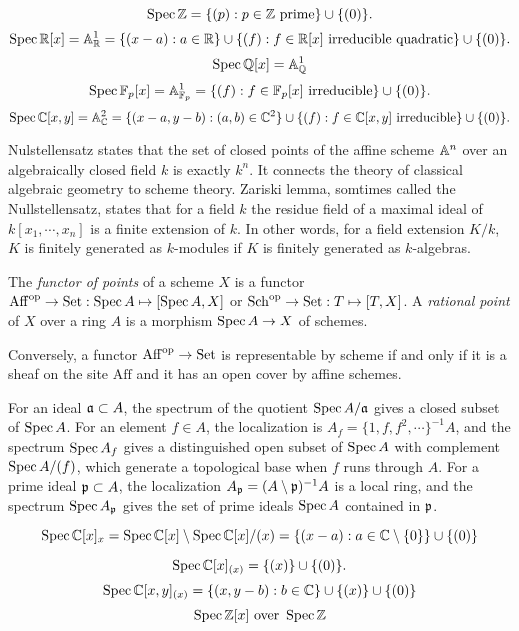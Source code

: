 \documentclass{../../large}
\begin{document}
\[\operatorname{Spec}\mathbb{Z}=\{(p):p\in\mathbb{Z}\text{ prime}\}\cup\{(0)\}.\]
\[\operatorname{Spec}\mathbb{R}[x]=\mathbb{A}^1_{\mathbb{R}}=\{(x-a):a\in\mathbb{R}\}\cup\{(f):f\in\mathbb{R}[x]\text{ irreducible quadratic}\}\cup\{(0)\}.\]
\[\operatorname{Spec}\mathbb{Q}[x]=\mathbb{A}^1_{\mathbb{Q}}\]
\[\operatorname{Spec}\mathbb{F}_p[x]=\mathbb{A}^1_{\mathbb{F}_p}=\{(f):f\in\mathbb{F}_p[x]\text{ irreducible}\}\cup\{(0)\}.\]
\[\operatorname{Spec}\mathbb{C}[x,y]=\mathbb{A}^2_{\mathbb{C}}=\{(x-a,y-b):(a,b)\in\mathbb{C}^2\}\cup\{(f):f\in\mathbb{C}[x,y]\text{ irreducible}\}\cup\{(0)\}.\]


Nulstellensatz states that the set of closed points of the affine scheme $\mathbb{A}^n$ over an algebraically closed field $k$ is exactly $k^n$.
It connects the theory of classical algebraic geometry to scheme theory.
Zariski lemma, somtimes called the Nullstellensatz, states that for a field $k$ the residue field of a maximal ideal of $k[x_1,\cdots,x_n]$ is a finite extension of $k$.
In other words, for a field extension $K/k$, $K$ is finitely generated as $k$-modules if $K$ is finitely generated as $k$-algebras.


\begin{prb}
The \emph{functor of points} of a scheme $X$ is a functor $\mathrm{Aff}^{\mathrm{op}}\to\mathrm{Set}:\operatorname{Spec} A\mapsto[\operatorname{Spec} A,X]$ or $\mathrm{Sch}^{\mathrm{op}}\to\mathrm{Set}:T\mapsto[T,X]$.
A \emph{rational point} of $X$ over a ring $A$ is a morphism $\operatorname{Spec} A\to X$ of schemes.

Conversely, a functor $\mathrm{Aff}^{\mathrm{op}}\to\mathrm{Set}$ is representable by scheme if and only if it is a sheaf on the site $\mathrm{Aff}$ and it has an open cover by affine schemes.
\end{prb}


\begin{prb}
\end{prb}

For an ideal $\mathfrak{a}\subset A$, the spectrum of the quotient $\operatorname{Spec} A/\mathfrak{a}$ gives a closed subset of $\operatorname{Spec} A$.
For an element $f\in A$, the localization is $A_f=\{1,f,f^2,\cdots\}^{-1}A$, and the spectrum $\operatorname{Spec} A_f$ gives a distinguished open subset of $\operatorname{Spec} A$ with complement $\operatorname{Spec} A/(f)$, which generate a topological base when $f$ runs through $A$.
For a prime ideal $\mathfrak{p}\subset A$, the localization $A_{\mathfrak{p}}=(A\setminus\mathfrak{p})^{-1}A$ is a local ring, and the spectrum $\operatorname{Spec} A_{\mathfrak{p}}$ gives the set of prime ideals $\operatorname{Spec} A$ contained in $\mathfrak{p}$.


\[\operatorname{Spec}\mathbb{C}[x]_x=\operatorname{Spec}\mathbb{C}[x]\setminus\operatorname{Spec}\mathbb{C}[x]/(x)=\{(x-a):a\in\mathbb{C}\setminus\{0\}\}\cup\{(0)\}\]

\[\operatorname{Spec}\mathbb{C}[x]_{(x)}=\{(x)\}\cup\{(0)\}.\]
\[\operatorname{Spec}\mathbb{C}[x,y]_{(x)}=\{(x,y-b):b\in\mathbb{C}\}\cup\{(x)\}\cup\{(0)\}\]
\[\operatorname{Spec}\mathbb{Z}[x]\text{ over }\operatorname{Spec}\mathbb{Z}\]
\end{document}
